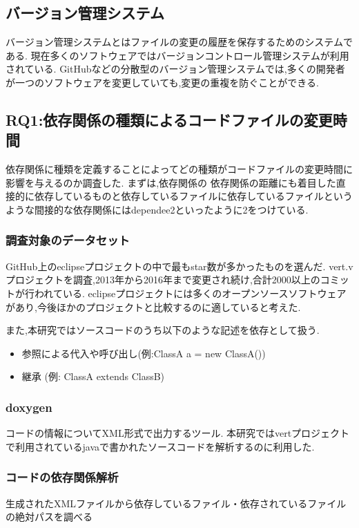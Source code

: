 \documentclass[submit,ses,noauthor]{ipsj} %
\begin{document}
\subsection{バージョン管理システム}
バージョン管理システムとはファイルの変更の履歴を保存するためのシステムである.
現在多くのソフトウェアではバージョンコントロール管理システムが利用されている.
GitHubなどの分散型のバージョン管理システムでは,多くの開発者が一つのソフトウェアを変更していても,変更の重複を防ぐことができる.

\subsection{RQ1:依存関係の種類によるコードファイルの変更時間}
依存関係に種類を定義することによってどの種類がコードファイルの変更時間に影響を与えるのか調査した.
まずは,依存関係の
依存関係の距離にも着目した直接的に依存しているものと依存しているファイルに依存しているファイルというような間接的な依存関係にはdependee2といったように2をつけている.


\subsubsection{調査対象のデータセット}
GitHub上のeclipseプロジェクトの中で最もstar数が多かったものを選んだ.
vert.vプロジェクトを調査,2013年から2016年まで変更され続け,合計2000以上のコミットが行われている.
eclipseプロジェクトには多くのオープンソースソフトウェアがあり,今後ほかのプロジェクトと比較するのに適していると考えた.

また,本研究ではソースコードのうち以下のような記述を依存として扱う.
\begin{itemize}
\item 参照による代入や呼び出し(例:ClassA a = new ClassA())
\item 継承 (例: ClassA extends ClassB)
\end{itemize}

\subsubsection{doxygen}
コードの情報についてXML形式で出力するツール.
本研究ではvertプロジェクトで利用されているjavaで書かれたソースコードを解析するのに利用した.

\subsubsection{コードの依存関係解析}
生成されたXMLファイルから依存しているファイル・依存されているファイルの絶対パスを調べる
\end{document}
